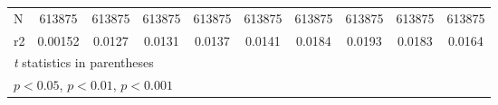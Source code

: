 {\begin{tabular}{l*{9}{c}}
N                   &      613875         &      613875         &      613875         &      613875         &      613875         &      613875         &      613875         &      613875         &      613875         \\
r2                  &     0.00152         &      0.0127         &      0.0131         &      0.0137         &      0.0141         &      0.0184         &      0.0193         &      0.0183         &      0.0164         \\
\hline\hline
\multicolumn{10}{l}{\footnotesize \textit{t} statistics in parentheses}\\
\multicolumn{10}{l}{\footnotesize \sym{*} \(p<0.05\), \sym{**} \(p<0.01\), \sym{***} \(p<0.001\)}\\
\end{tabular}
}
